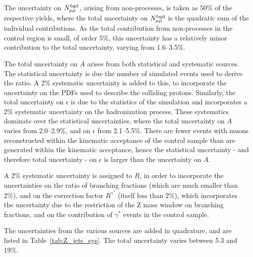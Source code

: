 The uncertainty on $N^{\rm bgd}_{\mu\mu}$, arising from non-\zmumubr processes, is taken as 
50\% of the respective yields, where the total uncertainty on $N^{\rm bgd}_{\mu\mu}$ is the quadratic sum of the individual contributions. 
As the total contribution from non-\zmumubr processes in the control region is small, of order 5\%, this uncertainty has a relatively minor contribution to the total uncertainty, varying from 1.6--3.5\%.

The total uncertainty on $A$ arises from both statistical and systematic sources. 
The statistical uncertainty is due the number of simulated events used to derive the ratio. 
A 2\% systematic uncertainty is added to this, to incorporate the uncertainty on the \ac{PDFs} used to describe the colliding protons.
Similarly, the total uncertainty on $\epsilon$ is due to the statistics of the simulation and incorporates a 2\% systematic uncertainty on the hadronization process. 
These systematics dominate over the statistical uncertainties, where the total uncertainty on $A$ varies from 2.0--2.9\%, and on $\epsilon$ from 2.1--5.5\%. 
There are fewer events with muons reconstructed within the kinematic acceptance of the control sample than are generated within the kinematic acceptance, hence the statistical uncertainty - and therefore total uncertainty - on $\epsilon$ is larger than the uncertainty on $A$.

A 2\% systematic uncertainty is assigned to $R$, in order to incorporate the uncertainties on the 
ratio of branching fractions (which are much smaller than 2\%), 
and on the correction factor $R^{\gamma^{*}}$ (itself less than 2\%), which incorporates 
the uncertainty due to the restriction of the Z mass window on branching fractions,
and on the contribution of $\gamma^{*}$ events in the control sample.

The uncertainties from the various sources are added in quadrature, and are listed in Table~\ref{tab:Z_jets_sys}. 
The total uncertainty varies between 5.3 and 19\%. 

